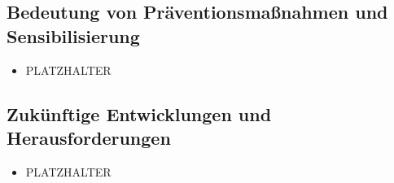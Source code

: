 \documentclass[12pt, a4paper, oneside]{scrartcl}
\begin{document}
\subsection{Bedeutung von Präventionsmaßnahmen und Sensibilisierung}
\begin{itemize}
  \item PLATZHALTER
\end{itemize}

\subsection{Zukünftige Entwicklungen und Herausforderungen}
\begin{itemize}
  \item PLATZHALTER
\end{itemize}

\clearpage
\printbibliography[title={Literaturverzeichnis}]
\end{document}
